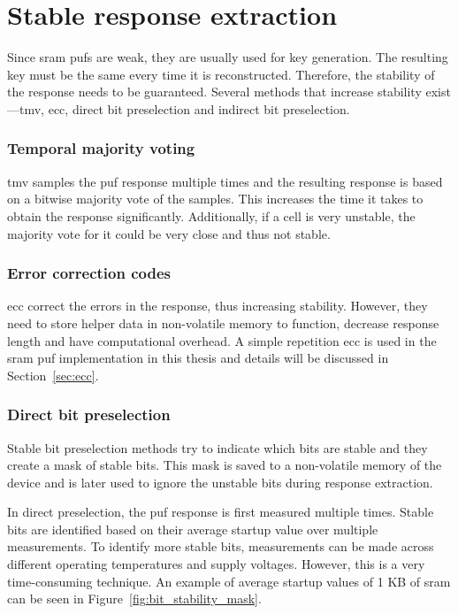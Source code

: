 \section{Stable response extraction}

Since \gls{sram} \glspl{puf} are weak, they are usually used for key generation. The resulting key must be the same every time it is reconstructed. Therefore, the stability of the response needs to be guaranteed. Several methods that increase stability exist---\gls{tmv}, \gls{ecc}, direct bit preselection and indirect bit preselection.~\cite{Shifman2018}

\subsubsection*{Temporal majority voting}

 \gls{tmv} samples the \gls{puf} response multiple times and the resulting response is based on a bitwise majority vote of the samples. This increases the time it takes to obtain the response significantly. Additionally, if a cell is very unstable, the majority vote for it could be very close and thus not stable.

\subsubsection*{Error correction codes}

 \gls{ecc} correct the errors in the response, thus increasing stability. However, they need to store helper data in non-volatile memory to function, decrease response length and have computational overhead. A simple repetition \gls{ecc} is used in the \gls{sram} \gls{puf} implementation in this thesis and details will be discussed in Section~\ref{sec:ecc}.

\subsubsection*{Direct bit preselection}

Stable bit preselection methods try to indicate which bits are stable and they create a mask of stable bits. This mask is saved to a non-volatile memory of the device and is later used to ignore the unstable bits during response extraction.

In direct preselection, the \gls{puf} response is first measured multiple times. Stable bits are identified based on their average startup value over multiple measurements. To identify more stable bits, measurements can be made across different operating temperatures and supply voltages. However, this is a very time-consuming technique. An example of average startup values of 1 KB of \gls{sram} can be seen in Figure~\ref{fig:bit_stability_mask}.

